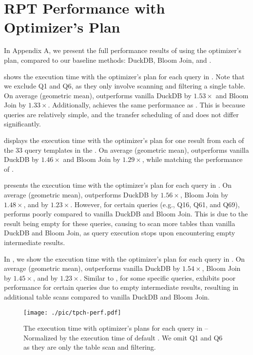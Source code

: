 \section{RPT Performance with Optimizer's Plan}

In Appendix A, we present the full performance results of \RPT using the optimizer's plan, compared to our baseline methods: DuckDB, Bloom Join, and \PT. 

 shows the execution time with the optimizer's plan for each query in \tpch. Note that we exclude Q1 and Q6, as they only involve scanning and filtering a single table. On average (geometric mean), \RPT outperforms vanilla DuckDB by $1.53\times$ and Bloom Join by $1.33\times$. Additionally, \RPT achieves the same performance as \PT. This is because \tpch queries are relatively simple, and the transfer scheduling of \PT and \RPT does not differ significantly.

 displays the execution time with the optimizer’s plan for one result from each of the 33 query templates in the \job. On average (geometric mean), \RPT outperforms vanilla DuckDB by $1.46\times$ and Bloom Join by $1.29\times$, while matching the performance of \PT.

 presents the execution time with the optimizer's plan for each query in \tpcds. On average (geometric mean), \RPT outperforms DuckDB by $1.56\times$, Bloom Join by $1.48\times$, and \PT by $1.23\times$. However, for certain queries (e.g., Q16, Q61, and Q69), \RPT performs poorly compared to vanilla DuckDB and Bloom Join. This is due to the result being empty for these queries, causing \RPT to scan more tables than vanilla DuckDB and Bloom Join, as query execution stops upon encountering empty intermediate results.

In , we show the execution time with the optimizer's plan for each query in \dsb.  On average (geometric mean), \RPT outperforms vanilla DuckDB by $1.54\times$, Bloom Join by $1.45\times$, and \PT by $1.23\times$. Similar to \tpcds, for some specific queries, \RPT exhibits poor performance for certain queries due to empty intermediate results, resulting in additional table scans compared to vanilla DuckDB and Bloom Join.

\begin{figure*}[t!]
    \centering
    \texttt{[image: ./pic/tpch-perf.pdf]}
    \caption{The execution time with optimizer's plans for each query in \tpch \textnormal{-- Normalized by the execution time of default \duckdb. We omit Q1 and Q6 as they are only the table scan and filtering.}}
    \label{fig:tpch-perf}
\end{figure*}

